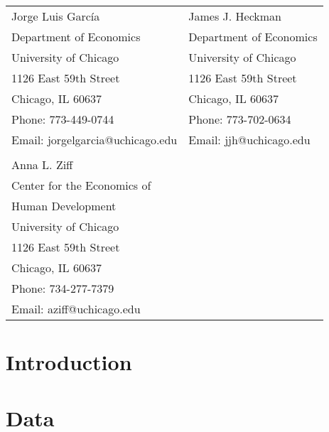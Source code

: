 \bigskip
\begin{tabular}{ll}
Jorge Luis Garc\'{i}a                                       & James J. Heckman \\
Department of Economics                                & Department of Economics \\
University of Chicago                                       & University of Chicago \\
1126 East 59th Street                                     & 1126 East 59th Street \\
Chicago, IL 60637                                           & Chicago, IL 60637 \\
Phone: 773-449-0744                                    & Phone: 773-702-0634  \\
Email: jorgelgarcia@uchicago.edu                       & Email: jjh@uchicago.edu \\
                                                                       & \\
Anna L. Ziff                                         &  \\
Center for the Economics of & \\
Human Development            & \\
University of Chicago                                        &  \\
1126 East 59th Street                       & \\
Chicago, IL 60637                                              &       \\
Phone: 734-277-7379                                    &  \\
Email: aziff@uchicago.edu                     &  \\

\end{tabular}

\clearpage

\restoregeometry
\doublespacing


\setcounter{page}{0}

\section{Introduction}
\label{sec:introduction}
	

\section{Data}
\label{sec:data}


